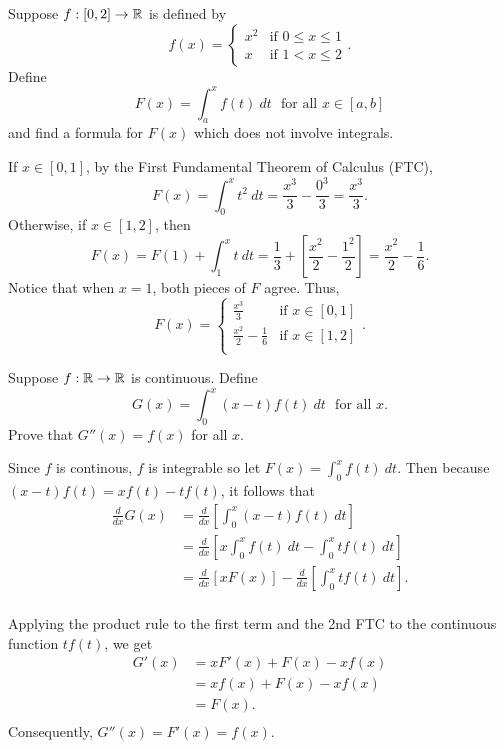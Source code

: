 \documentclass[letterpaper, twoside, 12pt]{book}
\begin{document}
\begin{exercise}[2b]
  Suppose \(f:[0,2]\to\mathbb R\) is defined by
  \[
    f(x) =
    \begin{cases}
      x^2 & \text{if } 0\leq x\leq 1 \\
      x   & \text{if } 1< x\leq 2
    \end{cases}
  .\]
  Define
  \[
    F(x)=\int_a^x f(t)~dt
    \text{~~for all~} x\in[a,b]
  \]
  and find a formula for \(F(x)\) which does not involve integrals.
\end{exercise}

\begin{solution}
    If \(x \in [0,1]\), by the First Fundamental Theorem of Calculus (FTC),
    \[ F(x) = \int_0^x t^2 ~dt = \frac{x^3}{3} - \frac{0^3}{3} = \frac{x^3}{3} . \] 
    Otherwise, if \(x \in [1,2]\), then
    \[ F(x) = F(1) + \int_1^x t ~dt = \frac{1}{3} + [ \frac{x^{2}}{2} - \frac{1^2}{2} ] 
        = \frac{x^{2}}{2} - \frac{1}{6} .\]
    Notice that when \(x = 1\), both pieces of \(F\) agree. Thus,
    \[ F(x) = \begin{cases}
                    \frac{x^{3}}{3} &\text{if } x \in [0, 1] \\
                    \frac{x^{2}}{2} - \frac{1}{6} &\text{if } x \in [1, 2] \\
              \end{cases} .\]
\end{solution}


\begin{exercise}[5]
  Suppose \(f:\mathbb R\to\mathbb R\) is continuous. Define
  \[
    G(x)
      =
    \int_0^x (x-t)f(t)~dt
    \text{~~for all~} x
  .\]
  Prove that \(G''(x)=f(x)\) for all \(x\).
\end{exercise}

\begin{solution}
    Since \(f\) is continous, \(f\) is integrable so let \(F(x) = \int_0^x f(t) ~dt\). 
    Then because \( (x-t)f(t) = xf(t) - tf(t)\), it follows that
    \begin{align*} 
        \frac{d}{dx} G(x) &= \frac{d}{dx} [ \int_0^x (x - t)f(t) ~dt ] \\
                          &= \frac{d}{dx} [ x \int_0^x f(t) ~dt - \int_0^x tf(t) ~dt ] \\
                          &= \frac{d}{dx} [x F(x)] - \frac{d}{dx}[ \int_0^x tf(t) ~dt ] .\\
    \end{align*}

    Applying the product rule to the first term and the 2nd FTC to the continuous 
    function \(t f(t)\), we get
    \begin{align*}
        G'(x) &= xF'(x) + F(x) - x f(x) \\
              &= xf(x)  + F(x) - x f(x) \\
              &= F(x) .\\
    \end{align*}
    Consequently, \(G''(x) = F'(x) = f(x)\).


\end{solution}
\end{document}
